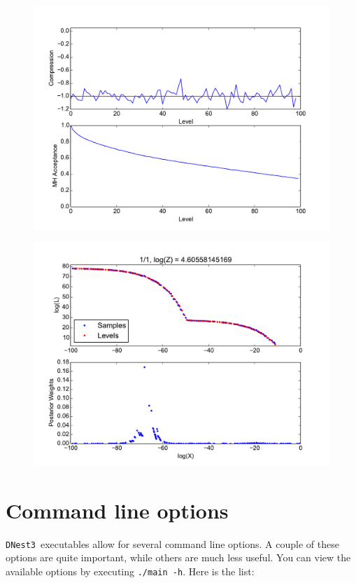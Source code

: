 \documentclass[a4paper, 11pt]{article}
\newcommand{\dnest}{{\tt DNest3}}
\begin{document}
\begin{figure}
\begin{center}
\includegraphics[scale=0.5]{fig2.pdf}
\caption{\label{fig:fig2}}
\end{center}
\end{figure}

\begin{figure}
\begin{center}
\includegraphics[scale=0.5]{fig3.pdf}
\caption{\label{fig:fig3}}
\end{center}
\end{figure}

\section{Command line options}
\dnest~executables allow for several command line options. A couple of these
options are quite important, while others are much less useful.
You can view the available options by executing
{\tt ./main -h}. Here is the list:
\end{document}
